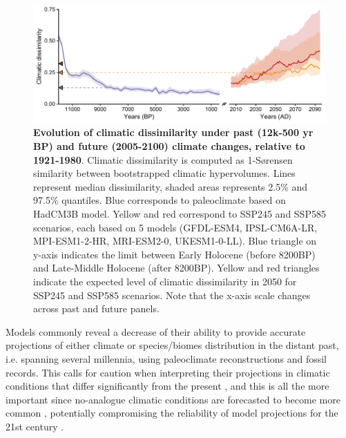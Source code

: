 \documentclass[pdflatex, sn-nature]{sn-jnl}%
\begin{document}
\begin{figure}[ht]
\centering
\hspace*{-0.6in}
\includegraphics[scale=1]{climatic_dissimilarity.pdf}
\caption{\textbf{Evolution of climatic dissimilarity under past (12k-500 yr BP) and future (2005-2100) climate changes, relative to 1921-1980}. Climatic dissimilarity is computed as 1-Sørensen similarity between bootstrapped climatic hypervolumes. Lines represent median dissimilarity, shaded areas represents 2.5\% and 97.5\% quantiles. Blue corresponds to paleoclimate based on HadCM3B model. Yellow and red correspond to SSP245 and SSP585 scenarios, each based on 5 models (GFDL-ESM4, IPSL-CM6A-LR, MPI-ESM1-2-HR, MRI-ESM2-0, UKESM1-0-LL). Blue triangle on y-axis indicates the limit between Early Holocene (before 8200BP) and Late-Middle Holocene (after 8200BP). Yellow and red triangles indicate the expected level of climatic dissimilarity in 2050 for SSP245 and SSP585 scenarios. Note that the x-axis scale changes across past and future panels.}\label{climatic_dissimilarity}
\end{figure}

Models commonly reveal a decrease of their ability to provide accurate projections of either climate \cite{Harrison2015} or species/biomes distribution \cite{Veloz2012, Pearman2008, Roberts2012, Foley2013} in the distant past, i.e. spanning several millennia, using paleoclimate reconstructions and fossil records. This calls for caution when interpreting their projections in climatic conditions that differ significantly from the present \cite{Maguire2016}, and this is all the more important since no-analogue climatic conditions are forecasted to become more common \cite{Williams2007}, potentially compromising the reliability of model projections for the 21st century \cite{Fitzpatrick2018}.
\end{document}
